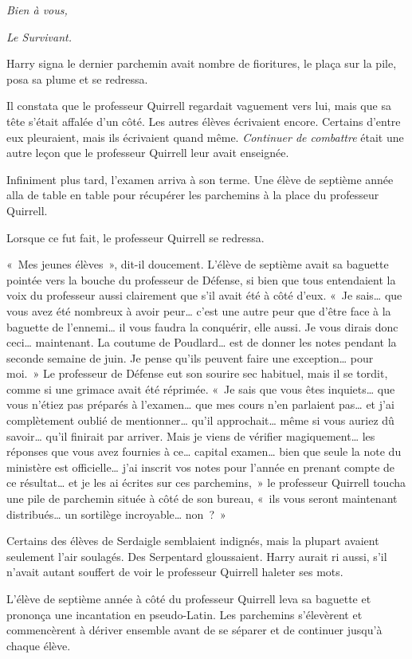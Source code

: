 \emph{Bien à vous,}

\emph{Le Survivant.}

Harry signa le dernier parchemin avait nombre de fioritures, le plaça sur la pile, posa sa plume et se redressa.

Il constata que le professeur Quirrell regardait vaguement vers lui, mais que sa tête s'était affalée d'un côté.
Les autres élèves écrivaient encore.
Certains d'entre eux pleuraient, mais ils écrivaient quand même.
\emph{Continuer de combattre} était une autre leçon que le professeur Quirrell leur avait enseignée.

Infiniment plus tard, l'examen arriva à son terme.
Une élève de septième année alla de table en table pour récupérer les parchemins à la place du professeur Quirrell.

Lorsque ce fut fait, le professeur Quirrell se redressa.

«~Mes jeunes élèves~», dit-il doucement.
L'élève de septième avait sa baguette pointée vers la bouche du professeur de Défense, si bien que tous entendaient la voix du professeur aussi clairement que s'il avait été à côté d'eux.
«~Je sais… que vous avez été nombreux à avoir peur… c'est une autre peur que d'être face à la baguette de l'ennemi… il vous faudra la conquérir, elle aussi.
Je vous dirais donc ceci… maintenant.
La coutume de Poudlard… est de donner les notes pendant la seconde semaine de juin.
Je pense qu'ils peuvent faire une exception… pour moi.~»
Le professeur de Défense eut son sourire sec habituel, mais il se tordit, comme si une grimace avait été réprimée.
«~Je sais que vous êtes inquiets… que vous n'étiez pas préparés à l'examen… que mes cours n'en parlaient pas… et j'ai complètement oublié de mentionner… qu'il approchait… même si vous auriez dû savoir… qu'il finirait par arriver.
Mais je viens de vérifier magiquement… les réponses que vous avez fournies à ce… capital examen… bien que seule la note du ministère est officielle… j'ai inscrit vos notes pour l'année en prenant compte de ce résultat… et je les ai écrites sur ces parchemins,~» le professeur Quirrell toucha une pile de parchemin située à côté de son bureau, «~ils vous seront maintenant distribués… un sortilège incroyable… non~?~»

Certains des élèves de Serdaigle semblaient indignés, mais la plupart avaient seulement l'air soulagés.
Des Serpentard gloussaient.
Harry aurait ri aussi, s'il n'avait autant souffert de voir le professeur Quirrell haleter ses mots.

L'élève de septième année à côté du professeur Quirrell leva sa baguette et prononça une incantation en pseudo-Latin.
Les parchemins s'élevèrent et commencèrent à dériver ensemble avant de se séparer et de continuer jusqu'à chaque élève.

